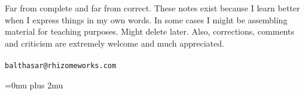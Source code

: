 \documentclass[openright,twoside,10pt]{book}
\begin{document}
Far from complete and far from correct. These notes exist because I learn better when I express things in my own words. In some cases I might be assembling material for teaching purposes. Might delete later. Also, corrections, comments and criticism are extremely welcome and much appreciated. \\
\\
\texttt{balthasar@rhizomeworks.com}

\tableofcontents














\Urlmuskip=0mu plus 2mu\relax


\end{document}
